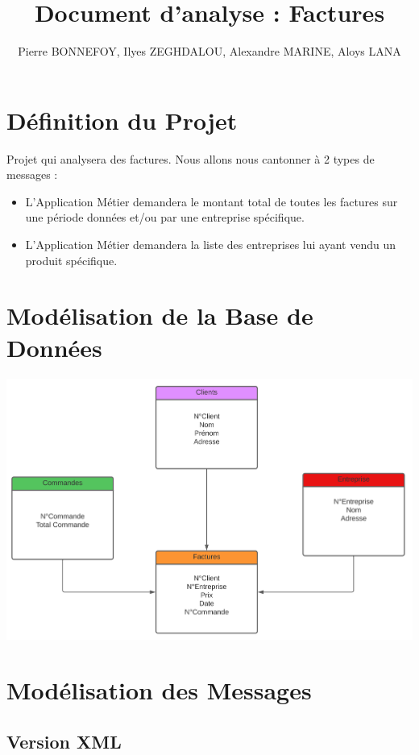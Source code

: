 \documentclass[a4paper, 11pt]{article}
\title{Document d'analyse : Factures}
\author{Pierre BONNEFOY, Ilyes ZEGHDALOU, Alexandre MARINE, Aloys LANA}
\begin{document}
\maketitle

\tableofcontents

\newpage
\section{Définition du Projet}
Projet qui analysera des factures. Nous allons nous cantonner à 2 types de messages :
\begin{itemize}
    \item L'Application Métier demandera le montant total de toutes les factures sur une période données et/ou par une entreprise spécifique.
    \item L'Application Métier demandera la liste des entreprises lui ayant vendu un produit spécifique.
\end{itemize}

\section{Modélisation de la Base de Données}
    \begin{center}
    \includegraphics[scale=0.3]{schema_bdd.png}
    \end{center}

\section{Modélisation des Messages}
    \subsection{Version XML}
\end{document}
